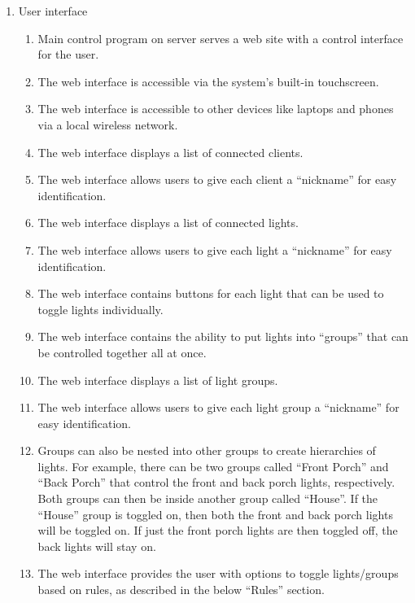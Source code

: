 \documentclass[12pt]{article}
\begin{document}
\begin{enumerate}
    \item User interface
        \begin{enumerate}
            \item Main control program on server serves a web site with a
                control interface for the user.
            \item The web interface is accessible via the system's built-in
                touchscreen.
            \item The web interface is accessible to other devices like laptops
                and phones via a local wireless network.
            \item The web interface displays a list of connected clients.
            \item The web interface allows users to give each client a
                ``nickname'' for easy identification.
            \item The web interface displays a list of connected lights.
            \item The web interface allows users to give each light a
                ``nickname'' for easy identification.
            \item The web interface contains buttons for each light that can be
                used to toggle lights individually.
            \item The web interface contains the ability to put lights into
                ``groups'' that can be controlled together all at once.
            \item The web interface displays a list of light groups.
            \item The web interface allows users to give each light group a
                ``nickname'' for easy identification.
            \item Groups can also be nested into other groups to create
                hierarchies of lights.  For example, there can be two groups
                called ``Front Porch'' and ``Back Porch'' that control the
                front and back porch lights, respectively.  Both groups can
                then be inside another group called ``House''.  If the
                ``House'' group is toggled on, then both the front and back
                porch lights will be toggled on.  If just the front porch
                lights are then toggled off, the back lights will stay on.
            \item The web interface provides the user with options to toggle
                lights/groups based on rules, as described in the below
                ``Rules'' section.
        \end{enumerate}


\end{enumerate}
\end{document}
